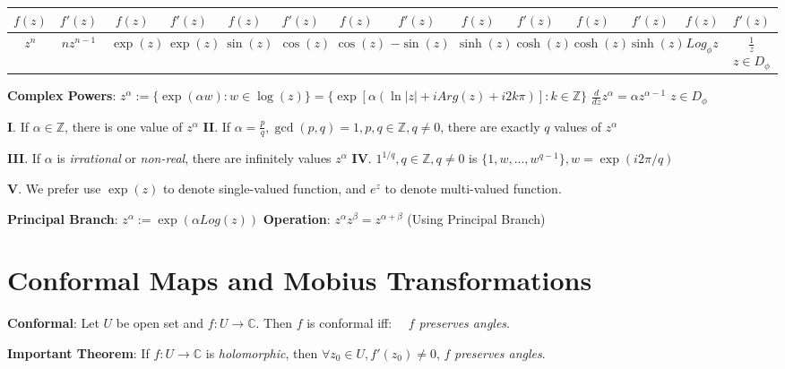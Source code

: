 \documentclass[9pt]{article}
\begin{document}
\vspace{-10pt}
\begin{longtable}{cc|cc|cc|cc|cc|cc|cc}
    $f(z)$ & $f'(z)$ & $f(z)$ & $f'(z)$ & $f(z)$ & $f'(z)$ & $f(z)$ & $f'(z)$ & $f(z)$ & $f'(z)$ & $f(z)$ & $f'(z)$ & $f(z)$ & $f'(z)$ \\
    \hline
    $z^n$ & $nz^{n-1}$ & $\exp(z)$ & $\exp(z)$ & $\sin(z)$ & $\cos(z)$ & $\cos(z)$ & $-\sin(z)$ & $\sinh(z)$ & $\cosh(z)$ & $\cosh(z)$ & $\sinh(z)$ & $Log_\phi z$ & $\frac{1}{z}$ {\tiny $z\in D_{\phi}$} \\
\end{longtable}
\vspace{-10pt}

\textbf{Complex Powers}: $z^{\alpha}:=\{\exp(\alpha w):w\in\log(z)\}=\{\exp[\alpha(\ln|z|+iArg(z)+i2k\pi)]:k\in\mathbb{Z}\}$ \quad \qquad \qquad \qquad $\frac{d}{dz}z^\alpha=\alpha z^{\alpha-1}$ {\tiny $z\in D_{\phi}$}

\qquad\textbf{I}. If $\alpha\in\mathbb{Z}$, there is one value of $z^{\alpha}$ \quad \quad \textbf{II}. If $\alpha=\frac{p}{q},\gcd(p,q)=1,p,q\in\mathbb{Z},q\ne0$, there are exactly $q$ values of $z^{\alpha}$

\qquad\textbf{III}. If $\alpha$ is \textit{irrational} or \textit{non-real}, there are infinitely values $z^{\alpha}$ \quad \quad \textbf{IV}. $1^{1/q},q\in\mathbb{Z},q\ne0$ is $\{1,w,...,w^{q-1}\},w=\exp(i2\pi/q)$

\qquad\textbf{V}. We prefer use $\exp(z)$ to denote single-valued function, and $e^z$ to denote multi-valued function. 

\qquad\textbf{Principal Branch}: $z^{\alpha}:=\exp(\alpha Log(z))$ \qquad \qquad \textbf{Operation}: $z^{\alpha}z^{\beta}=z^{\alpha+\beta}$ {\footnotesize (Using Principal Branch)} 


\section{Conformal Maps and Mobius Transformations} %

\textbf{Conformal}: Let $U$ be open set and $f:U\to\mathbb{C}$. Then $f$ is conformal iff: \ \ $f$ \textit{preserves angles}. 

\quad \textbf{Important Theorem}: If $f:U\to\mathbb{C}$ is \textit{holomorphic}, then $\forall z_0\in U,f'(z_0)\ne0$, $f$ \textit{preserves angles}.
\end{document}
